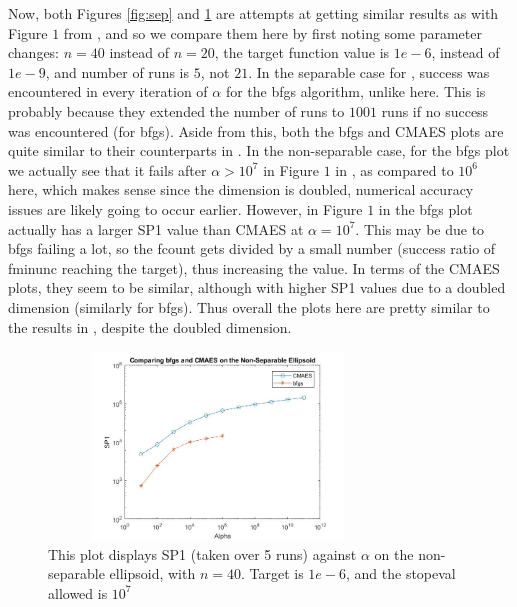 \documentclass[sigconf, 6pt]{acmart}
\begin{document}
Now, both  Figures \ref{fig:sep} and \ref{fig:nonsep} are attempts at getting similar results as with Figure $1$ from \cite{derivativefree}, and so we compare them here by first noting some parameter changes: $n=40$ instead of $n=20$, the target function value is $1e-6$, instead of $1e-9$, and number of runs is $5$, not $21$. In the separable case for \cite{derivativefree}, success was encountered in every iteration of $\alpha$ for the bfgs algorithm, unlike here. This is probably because they extended the number of runs to $1001$ runs if no success was encountered (for bfgs). Aside from this, both the bfgs and CMAES plots are quite similar to their counterparts in \cite{derivativefree}. In the non-separable case, for the bfgs plot we actually see that it fails after $\alpha>10^7$ in Figure $1$ in \cite{derivativefree}, as compared to $10^6$ here, which makes sense since the dimension is doubled, numerical accuracy issues are likely going to occur earlier. However, in Figure $1$ in \cite{derivativefree} the bfgs plot actually has a larger SP1 value than CMAES at $\alpha = 10^7$. This may be due to bfgs failing a lot, so the fcount gets divided by a small number (success ratio of fminunc reaching the target), thus increasing the value. In terms of the CMAES plots, they seem to be similar, although with higher SP1 values due to a doubled dimension (similarly for bfgs). Thus overall the plots here are pretty similar to the results in \cite{derivativefree}, despite the doubled dimension.

\begin{figure}[h]
\centering
  \includegraphics[height = 5cm, width=9cm]{A3nonseparable40.jpg}
  \caption{This plot displays SP1 (taken over 5 runs) against $\alpha$ on the non-separable ellipsoid, with $n = 40$. Target is $1e-6$, and the stopeval allowed is $10^7$}
  \label{fig:nonsep}
\end{figure}
\end{document}
